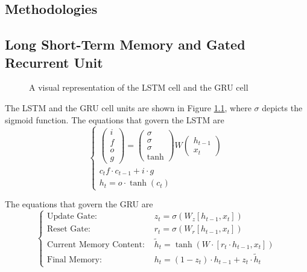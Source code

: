 \begin{appendices}
\chapter{Methodologies}
\section{Long Short-Term Memory and Gated Recurrent Unit} \label{app:LSTM_GRU}

\begin{center}
\begin{figure}[H]
    \caption{A visual representation of the LSTM cell and the GRU cell}
    \label{app::LSTM_GRU}
\end{figure}
\end{center}

The LSTM and the GRU cell units are shown in Figure \ref{app::LSTM_GRU}, where $\sigma$ depicts the sigmoid function. The equations that govern the LSTM are
\begin{equation*}
\begin{cases}
\begin{pmatrix} i \\ f \\ o \\ g \end{pmatrix} = \begin{pmatrix} \sigma \\ \sigma \\ \sigma \\ \tanh \end{pmatrix} W \begin{pmatrix} h_{t-1} \\ x_t \end{pmatrix} \\
c_t f \cdot c_{t-1} + i \cdot g \\
h_t = o \cdot \tanh(c_t)
\end{cases}
\end{equation*}

The equations that govern the GRU are
\begin{equation*}
\begin{cases}
\text{Update Gate: } &  z_t = \sigma(W_z [h_{t-1},x_t]) \\
\text{Reset Gate: } & r_t = \sigma(W_r[h_{t-1},x_t]) \\
\text{Current Memory Content: } & \tilde{h}_t = \tanh(W \cdot [r_t \cdot h_{t-1}, x_t]) \\
\text{Final Memory: } & h_t = (1-z_t) \cdot h_{t-1} + z_t \cdot \tilde{h}_t
\end{cases}
\end{equation*}


\end{appendices}
